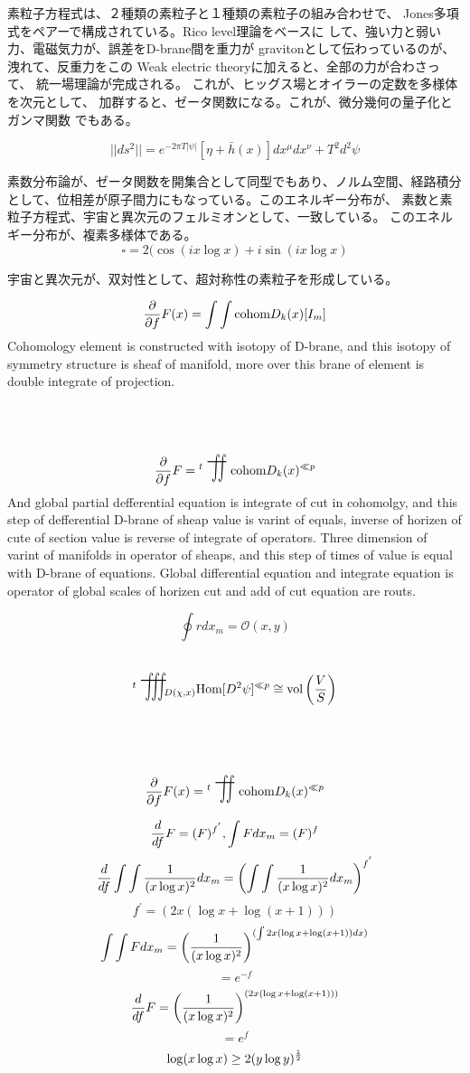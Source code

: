 \documentclass{jsarticle}
\begin{document}
     素粒子方程式は、２種類の素粒子と１種類の素粒子の組み合わせで、
   Jones多項式をペアーで構成されている。Rico level理論をベースに
   して、強い力と弱い力、電磁気力が、誤差をD-brane間を重力が
   gravitonとして伝わっているのが、洩れて、反重力をこの
   Weak electric theoryに加えると、全部の力が合わさって、
   統一場理論が完成される。
   これが、ヒッグス場とオイラーの定数を多様体を次元として、
   加群すると、ゼータ関数になる。これが、微分幾何の量子化とガンマ関数
   でもある。

   $$ ||ds^2|| = e^{-2 \pi T|\psi|}[\eta + \bar{h}(x)]dx^{\mu}dx^{\nu}
   + T^2 d^2 \psi $$
   
      素数分布論が、ゼータ関数を開集合として同型でもあり、ノルム空間、経路積分
   として、位相差が原子間力にもなっている。このエネルギー分布が、
   素数と素粒子方程式、宇宙と異次元のフェルミオンとして、一致している。
   このエネルギー分布が、複素多様体である。
   $$\square = 2 (\cos (i x \log x) + i \sin(i x \log x) $$ 


      宇宙と異次元が、双対性として、超対称性の素粒子を形成している。　


 $$ {\partial \over \partial f}F(x) = \int \int \text{cohom}D_k(x)[I_m]  $$
 Cohomology element is constructed with isotopy of D-brane,
 and this isotopy of symmetry structure is sheaf of manifold,
 more over this brane of element is double integrate of projection.
 $$ {\partial \over \partial f}F = {{}^t {\scalebox{1}[2]{{\variint}}}}
 \text{cohom}D_k(x)^{\ll p} $$
 And global partial defferential equation is integrate of cut in cohomolgy,
 and this step of defferential D-brane of sheap value is varint of equals,
 inverse of horizen of cute of section value is reverse of integrate of 
 operators. Three dimension of varint of manifolds in operator of sheaps,
 and this step of times of value is equal with D-brane of equations.
 Global differential equation and integrate equation is operator of 
 global scales of horizen cut and add of cut equation are routs.

 $$ \oint r dx_m = \mathcal{O}(x,y) $$

 $$ {{}^t {\scalebox{1}[2]{{\variiint}}}}_{{D(\chi,x)}} \text{Hom}[D^2 \psi]
 ^{\ll p} \cong  \text{vol}\left({V \over S}\right) $$

 $$ {\partial \over \partial f}F(x) = {{}^t \scalebox{1}[2]{\variint}} 
 \text{cohom}D_k(x)^{\ll p} $$

 $$ {d \over df}F = (F)^{f^{'}}, \int F dx_m = (F)^{f}  $$
 $$ {d \over df}\int \int{1 \over (x \log x)^2}dx_m =
 \left(\int \int{1 \over (x \log x)^2}dx_m \right)^{f^{'}}  $$
 $$ f^{'} = (2x (\log x + \log (x + 1))) $$
  $$  \int \int F dx_m = \left({1 \over (x \log x)^2}\right)^{
	  (\int 2x (\log x + \log (x + 1))dx)} $$ 
   $$= e^{-f} $$
  $$ {d \over df}F = \left({1 \over (x \log x)^2}\right)^{
	  (2x (\log x + \log (x + 1))) } $$  
  $$= e^{f} $$
  $$ \log (x \log x) \ge 2(y \log y)^{1 \over 2} $$
\end{document}
